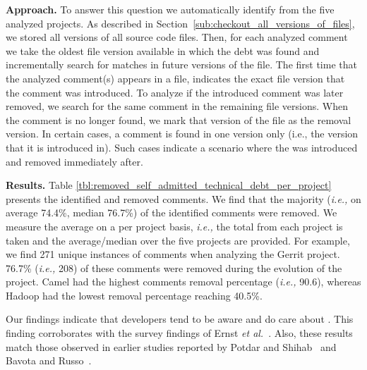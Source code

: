 \noindent\textbf{Approach.} To answer this question we automatically identify \SATD from the five analyzed projects. As described in Section~\ref{sub:checkout_all_versions_of_files}, we stored all versions of all source code files. Then, for each analyzed \SATD comment we take the oldest file version available in which the debt was found and incrementally search for matches in future versions of the file. The first time that the analyzed \SATD comment(s) appears in a file, indicates the exact file version that the \SATD comment was introduced. To analyze if the introduced \SATD comment was later removed, we search for the same comment in the remaining file versions. When the comment is no longer found, we mark that version of the file as the removal version. In certain cases, a \SATD comment is found in one version only (i.e., the version that it is introduced in). Such cases indicate a scenario where the \SATD was introduced and removed immediately after. 



\noindent\textbf{Results.} Table \ref{tbl:removed_self_admitted_technical_debt_per_project} presents the identified and removed \SATD comments. We find that the majority (\textit{i.e.,} on average 74.4\%, median 76.7\%) of the identified \SATD comments were removed. We measure the average on a per project basis, \textit{i.e.,} the total from each project is taken and the average/median over the five projects are provided. For example, we find 271 unique instances of \SATD comments when analyzing the Gerrit project. 76.7\% (\textit{i.e.,} 208) of these \SATD comments were removed during the evolution of the project. Camel had the highest \SATD comments removal percentage (\textit{i.e.,} 90.6), whereas Hadoop had the lowest removal percentage reaching 40.5\%. 

Our findings indicate that developers tend to be aware and do care about \SATD. This finding corroborates with the survey findings of Ernst \emph{et al.}~\cite{Ernst2015FSE}. Also, these results match those observed in earlier studies reported by Potdar and Shihab~\cite{Potdar2014ICSME} and Bavota and Russo~\cite{Bavota2016MSR}.






 

\subsection*{\rqii}

